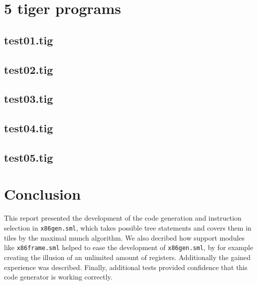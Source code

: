 \documentclass{article}
\begin{document}
\section{5 tiger programs}

\subsection{test01.tig}



\subsection{test02.tig}



\subsection{test03.tig}



\subsection{test04.tig}



\subsection{test05.tig}



\section{Conclusion}

This report presented the development of the code generation and instruction selection in \texttt{x86gen.sml}, which takes possible tree statements and covers them in tiles by the maximal munch algorithm. We also decribed how support modules like \texttt{x86frame.sml} helped to ease the development of \texttt{x86gen.sml}, by for example creating the illusion of an unlimited amount of registers. Additionally the gained experience was described. Finally, additional tests provided confidence that this code generator is working correctly.
\end{document}
